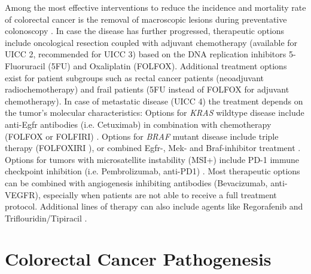 \begin{flushleft}
Among the most effective interventions to reduce the incidence and mortality rate of colorectal cancer is the removal of macroscopic lesions during preventative colonoscopy \citep{nishiharaLongtermColorectalcancerIncidence2013}. In case the disease has further progressed, therapeutic options include oncological resection coupled with adjuvant chemotherapy (available for UICC 2, recommended for UICC 3) based on the DNA replication inhibitors 5-Fluoruracil (5FU) and Oxaliplatin (FOLFOX). Additional treatment options exist for patient subgroups such as rectal cancer patients (neoadjuvant radiochemotherapy) and frail patients (5FU instead of FOLFOX for adjuvant chemotherapy). In case of metastatic disease (UICC 4) the treatment depends on the tumor's molecular characteristics: Options for \textit{KRAS} wildtype disease include anti-Egfr antibodies (i.e. Cetuximab) in combination with chemotherapy (FOLFOX or FOLFIRI) \citep{vancutsemESMOConsensusGuidelines2016a}. Options for \textit{BRAF} mutant disease include triple therapy (FOLFOXIRI \citep{vancutsemESMOConsensusGuidelines2016a}), or combined Egfr-, Mek- and Braf-inhibitor treatment \citep{kopetzEncorafenibBinimetinibCetuximab2019}. Options for tumors with microsatellite instability (MSI+) include PD-1 immune checkpoint inhibition (i.e. Pembrolizumab, anti-PD1) \citep{andrePembrolizumabMicrosatelliteInstabilityHighAdvanced2020}. Most therapeutic options can be combined with angiogenesis inhibiting antibodies (Bevacizumab, anti-VEGFR), especially when patients are not able to receive a full treatment protocol. Additional lines of therapy can also include agents like Regorafenib and Triflouridin/Tipiracil \citep{vancutsemESMOConsensusGuidelines2016a}. 
\par

\section{Colorectal Cancer Pathogenesis}


\end{flushleft}
